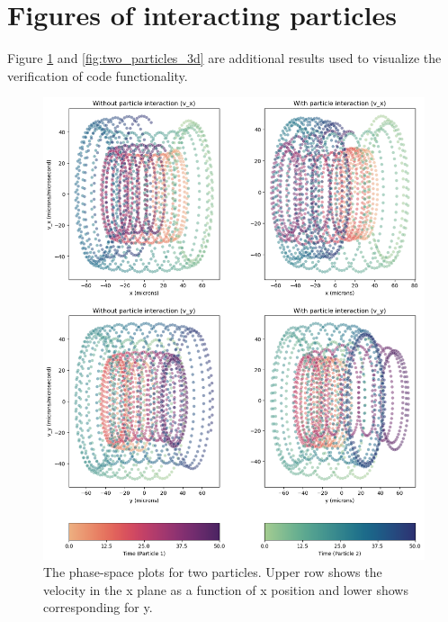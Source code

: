 \documentclass[12pt,a4paper,twocolumn]{article}
\begin{document}







\newpage 
\twocolumn[
\printbibliography
]
\newpage
\onecolumn

\appendix


\section{Figures of interacting particles}

Figure \ref{fig:phase-space} and \ref{fig:two_particles_3d} are additional results used to visualize the verification of code functionality. 

\begin{figure}[h!]
    \centering
    \includegraphics[width=.9\linewidth]{Project 3/figures/two_particles_v-vs-r.png}
    \caption{The phase-space plots for two particles. Upper row shows the velocity in the x plane as a function of x position and lower shows corresponding for y.}
    \label{fig:phase-space}
\end{figure}
\end{document}

